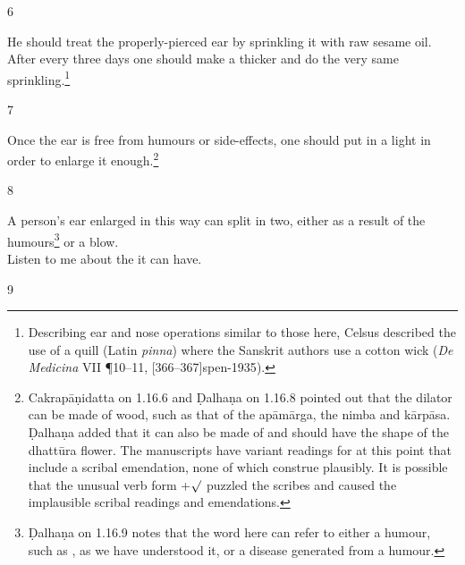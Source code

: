 \begin{translation}
\item[6] 
    
He should treat the properly-pierced ear by sprinkling it with raw sesame
oil.   After every three days one should make a thicker
 and do the very same sprinkling.\footnote{Describing
    ear and nose operations similar to those here, Celsus described the use of a
    quill (Latin \emph{pinna}) where the Sanskrit authors use a cotton wick
    (\emph{De Medicina} VII \P10--11, [366--367]{spen-1935}).}
    
\item[7] 
    
Once the ear is free from humours or side-effects, one should put in a light
 in order to enlarge it
enough.\footnote{Cakrapāṇidatta on 1.16.6 \citep[127]{acar-1939} and Ḍalhaṇa
    on 1.16.8 \citep[77]{vulgate} pointed out that the dilator can be made of
    wood, such as that of the \gls{apāmārga}, the  \gls{nimba} and  \gls{kārpāsa}.
    Ḍalhaṇa added that it can also be made of  and should
    have the shape of the \gls{dhattūra} flower. The manuscripts have variant
    readings for  at this point that include a
    scribal emendation, none of which construe plausibly. It is possible that the
    unusual verb form +$\surd$ puzzled the scribes and caused the
    implausible scribal readings and emendations.}
    
\item[8]
    
\begin{em}
A person's ear enlarged in this way can split in two, either as a result of the 
humours\footnote{Ḍalhaṇa on 1.16.9  \citep[77]{vulgate} notes that the word  
here can refer to either a humour, such as , as we have 
understood it, or a 
disease generated from a humour.} or a blow.\\ Listen to me about the 
it can have. 
    \end{em}
    
\item[9]
    

\end{translation}
